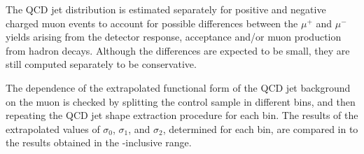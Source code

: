 The QCD jet \ptmiss distribution is estimated separately for positive and negative charged muon events to account for possible differences between the $\mu^{+}$ and $\mu^{-}$ yields arising from the detector response, acceptance and/or muon production from hadron decays. Although the differences are expected to be small, they are still computed separately to be conservative.

The dependence of the extrapolated \ptmiss functional form of the QCD jet background on the muon \etaMuCM is checked by splitting the control sample in different \etaMuCM bins, and then repeating the QCD jet shape extraction procedure for each \etaMuCM bin. The results of the extrapolated values of $\sigma_{0}$, $\sigma_{1}$, and $\sigma_{2}$, determined for each \etaMuCM bin, are compared in  to the results obtained in the \etaMuCM-inclusive range.

